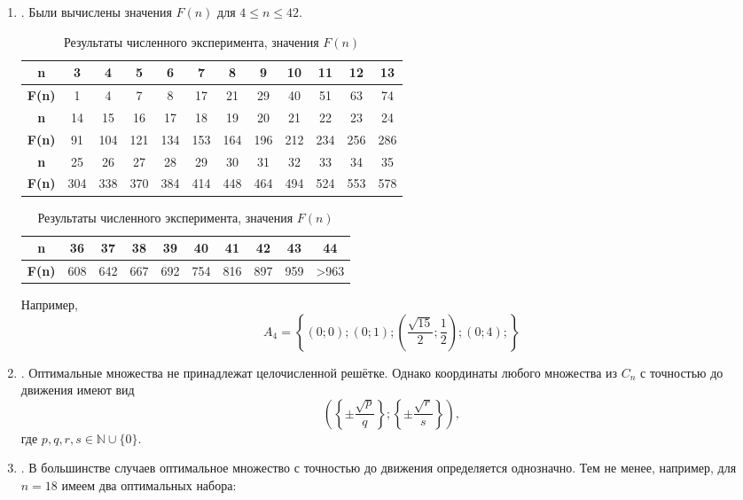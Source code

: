 \documentclass[a4paper,14pt]{article} %
\begin{document}
\begin{enumerate}

\item.
Были вычислены значения $F(n)$ для $4\leq n \leq 42$.

\begin{table}[H]
\caption{Результаты численного эксперимента, значения $F(n)$}
\label{tabular:pc_counted}
\begin{center}
\begin{tabular}{|c|c|c|c|c|c|c|c|c|c|c|c|}
\hline
\textbf{n}    &  3 & 4 & 5 & 6 &  7 &  8 &  9 & 10 & 11 & 12 & 13 \\
\hline
\textbf{F(n)} &  1 & 4 & 7 & 8 & 17 & 21 & 29 & 40 & 51 & 63 & 74  \\
\hline
\hline
\textbf{n}    &  14 &  15 &  16 &  17 &  18 &  19 &  20 &  21 &  22 &  23 &  24 \\
\hline
\textbf{F(n)} &  91 & 104 & 121 & 134 & 153 & 164 & 196 & 212 & 234 & 256 & 286  \\
\hline
\hline
\textbf{n}    &  25 &  26 &  27 &  28 &  29 &  30 &  31 &  32 &  33 &  34 &  35 \\
\hline
\textbf{F(n)} & 304 & 338 & 370 & 384 & 414 & 448 & 464 & 494 & 524 & 553 & 578  \\
\hline
\end{tabular}
\begin{tabular}{|c|c|c|c|c|c|c|c|c|c|}
\hline
\textbf{n}    &  36 &  37 &  38 &  39 &  40 &  41 &  42 &  43 & 44 \\
\hline
\textbf{F(n)} & 608 & 642 & 667 & 692 & 754 & 816 & 897 & 959 & >963 \\
\hline
\end{tabular}
\end{center}
\end{table}

Например,
$$
A_4=\left\{( 0 ; 0 ); ( 0 ; 1 ); \left( \frac{\sqrt{15}}{2} ; \frac{1}{2} \right); ( 0 ; 4 ); \right\}
$$

\item.
Оптимальные множества не принадлежат целочисленной решётке.
Однако координаты любого множества из $C_n$ с точностью до движения имеют вид
$$
	\left(
		\left\{\pm\frac{\sqrt{p}}{q}\right\};
		\left\{\pm\frac{\sqrt{r}}{s}\right\}
	\right),$$
где $p,q,r,s \in \mathbb{N} \cup \{0\}$.

\item.
В большинстве случаев оптимальное множество с точностью до движения определяется однозначно.
Тем не менее, например, для $n=18$ имеем два оптимальных набора:


\end{enumerate}
\end{document}
